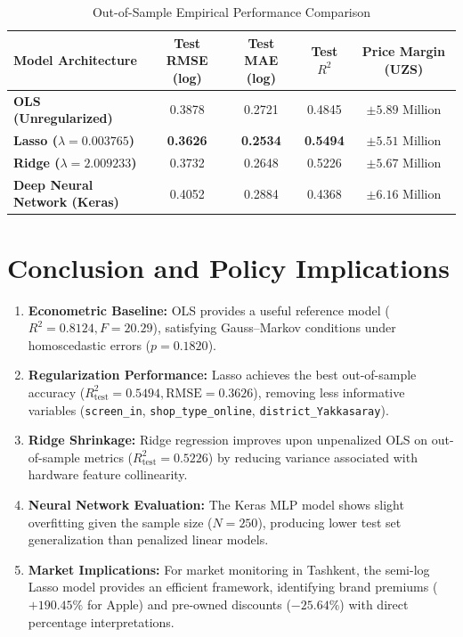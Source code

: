 \documentclass[11pt, a4paper]{article}
\begin{document}
\begin{table}[h!]
\centering
\caption{Out-of-Sample Empirical Performance Comparison}
\vspace{0.2cm}
\small
\begin{tabular}{lcccc}
\toprule
\textbf{Model Architecture} & \textbf{Test RMSE (log)} & \textbf{Test MAE (log)} & \textbf{Test $R^2$} & \textbf{Price Margin (UZS)} \\
\midrule
\textbf{OLS (Unregularized)} & 0.3878 & 0.2721 & 0.4845 & $\pm 5.89\text{ Million}$ \\
\textbf{Lasso ($\lambda = 0.003765$)} & \textbf{0.3626} & \textbf{0.2534} & \textbf{0.5494} & \textbf{$\pm 5.51\text{ Million}$} \\
\textbf{Ridge ($\lambda = 2.009233$)} & 0.3732 & 0.2648 & 0.5226 & $\pm 5.67\text{ Million}$ \\
\textbf{Deep Neural Network (Keras)} & 0.4052 & 0.2884 & 0.4368 & $\pm 6.16\text{ Million}$ \\
\bottomrule
\end{tabular}
\end{table}

\section{Conclusion and Policy Implications}

\begin{enumerate}
    \item \textbf{Econometric Baseline:} OLS provides a useful reference model ($R^2 = 0.8124, F = 20.29$), satisfying Gauss--Markov conditions under homoscedastic errors ($p = 0.1820$).
    \item \textbf{Regularization Performance:} Lasso achieves the best out-of-sample accuracy ($R^2_{\text{test}} = 0.5494, \text{RMSE} = 0.3626$), removing less informative variables (\texttt{screen\_in}, \texttt{shop\_type\_online}, \texttt{district\_Yakkasaray}).
    \item \textbf{Ridge Shrinkage:} Ridge regression improves upon unpenalized OLS on out-of-sample metrics ($R^2_{\text{test}} = 0.5226$) by reducing variance associated with hardware feature collinearity.
    \item \textbf{Neural Network Evaluation:} The Keras MLP model shows slight overfitting given the sample size ($N = 250$), producing lower test set generalization than penalized linear models.
    \item \textbf{Market Implications:} For market monitoring in Tashkent, the semi-log Lasso model provides an efficient framework, identifying brand premiums ($+190.45\%$ for Apple) and pre-owned discounts ($-25.64\%$) with direct percentage interpretations.
\end{enumerate}
\end{document}
